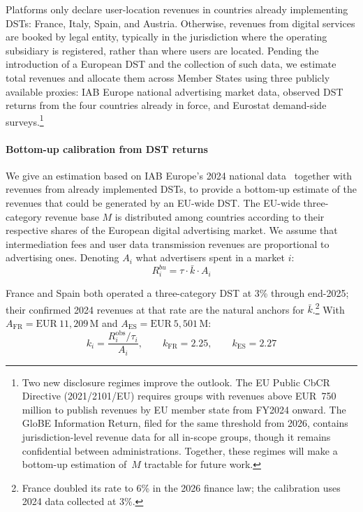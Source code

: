 \documentclass[../../main]{subfiles}
\begin{document}
Platforms only declare user-location revenues in countries already implementing DSTs: France, Italy, Spain, and Austria.
Otherwise, revenues from digital services are booked by legal entity, typically in the jurisdiction where the operating subsidiary is registered, rather than where users are located.
Pending the introduction of a European DST and the collection of such data, we estimate total revenues and allocate them across Member States using three publicly available proxies: IAB Europe national advertising market data, observed DST returns from the four countries already in force, and Eurostat demand-side surveys.\footnote{Two new disclosure regimes improve the outlook. The EU Public CbCR Directive (2021/2101/EU) requires groups with revenues above EUR~750\,million to publish revenues by EU member state from FY2024 onward. The GloBE Information Return, filed for the same threshold from 2026, contains jurisdiction-level revenue data for all in-scope groups, though it remains confidential between administrations. Together, these regimes will make a bottom-up estimation of~$M$ tractable for future work.}


\paragraph{Bottom-up calibration from DST returns}

We give an estimation based on IAB Europe's 2024 national data~\citep{iab_adex_2024} together with revenues from already implemented DSTs, to provide a bottom-up estimate of the revenues that could be generated by an EU-wide DST.
The EU-wide three-category revenue base $M$ is distributed among countries according to their respective shares of the European digital advertising market.
We assume that intermediation fees and user data transmission revenues are proportional to advertising ones. 
Denoting $A_i$ what advertisers spent in a market $i$:
\begin{equation}
  R_i^{bu} = \tau \cdot \bar{k} \cdot A_i
  \label{eq:M2}
\end{equation}



France and Spain both operated a three-category DST at 3\% through end-2025; their confirmed 2024 revenues at that rate are the natural anchors for $\bar{k}$.\footnote{France doubled its rate to 6\% in the 2026 finance law; the calibration uses 2024 data collected at 3\%.}
With $A_{\mathrm{FR}} = \text{EUR}~11{,}209\,\text{M}$ and $A_{\mathrm{ES}} = \text{EUR}~5{,}501\,\text{M}$:
\begin{equation}
  k_i = \frac{R_i^{\mathrm{obs}} / \tau_i}{A_i}, \qquad
  k_{\mathrm{FR}}  = 2.25, \qquad
  k_{\mathrm{ES}}  = 2.27
  \label{eq:calib}
\end{equation}
\end{document}
